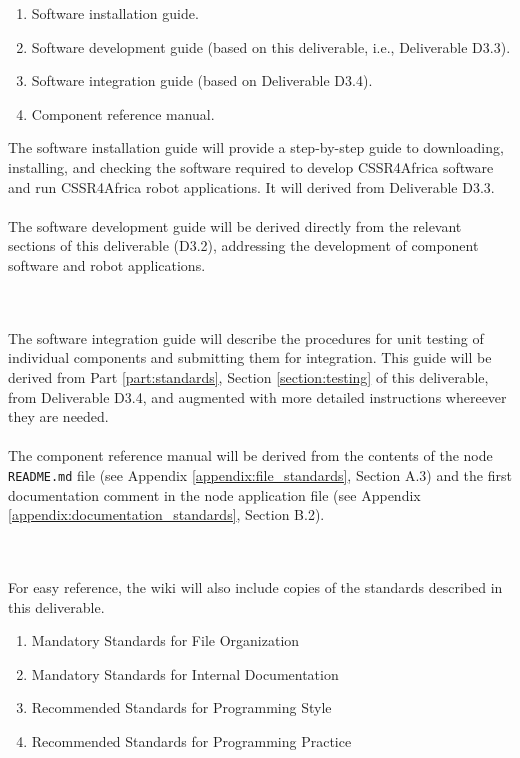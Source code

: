 \documentclass{CSSRforAfrica}
\newcommand{\blank}{~\\}
\begin{document}
\begin{enumerate}
\item Software installation guide.
\item Software development guide (based on this deliverable, i.e., Deliverable D3.3).
\item Software integration guide (based on Deliverable D3.4).
\item Component reference manual.
\end{enumerate}
The software installation guide will provide a step-by-step guide to downloading, installing, and checking the software required to develop CSSR4Africa software  and run CSSR4Africa robot applications.   It will derived from  Deliverable D3.3.
\blank
~
\blank
The software development guide will be derived directly from the relevant sections of this deliverable (D3.2), addressing the development of component software and robot applications.   

\blank
~
\blank
The software integration guide will describe the procedures for unit testing of individual components and submitting them for integration.  This guide  will be derived from Part \ref{part:standards}, Section \ref{section:testing} of this deliverable, from Deliverable D3.4, and augmented with more detailed instructions whereever they are needed.
\blank
~
\blank
The component reference manual will be derived from the contents of the node {\small \verb+README.md+} file (see Appendix \ref{appendix:file_standards}, Section A.3) and the first documentation comment in the node application file (see Appendix \ref{appendix:documentation_standards}, Section B.2).

\blank
~
\blank
For easy reference, the wiki  will also include copies of the standards described in this deliverable.
\begin{enumerate}
\item Mandatory Standards for File Organization
\item Mandatory Standards for Internal Documentation
\item Recommended Standards for Programming Style
\item Recommended Standards for Programming Practice
\end{enumerate}
\end{document}

